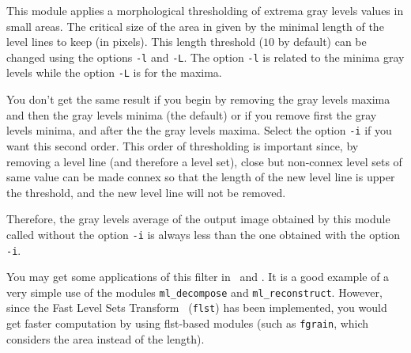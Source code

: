 This module applies a morphological thresholding of extrema gray levels values
in small areas.
The critical size of the area in given by the minimal length of the level lines
to keep (in pixels).
This length threshold ($10$ by default) can be changed using the options
\verb+-l+ and \verb+-L+.
The option \verb+-l+ is related to the minima gray levels while the option
\verb+-L+ is for the maxima.

You don't get the same result if you begin by removing the gray levels maxima
and then the gray levels minima (the default) or if you remove first the
gray levels minima, and after the the gray levels maxima. 
Select the option \verb+-i+ if you want this second order.
This order of thresholding is important since, by removing a level
line (and therefore a level set), close but non-connex level sets of same 
value can be made connex so that the length of the new level line is upper
the threshold, and the new level line will not be removed.

Therefore, the gray levels average of the output image obtained by this
module called without the option \verb+-i+ is always less than the 
one obtained with the option \verb+-i+.

You may get some applications of this filter in~\cite{froment:perceptible}
and \cite{froment:functional}.
It is a good example of a very simple use of the modules \verb+ml_decompose+ and
\verb+ml_reconstruct+. However, since the Fast Level Sets 
Transform~\cite{monasse.guichard:fast} (\verb+flst+) has been implemented, 
you would get faster computation by using flst-based modules 
(such as \verb+fgrain+, which considers the area instead of the length).